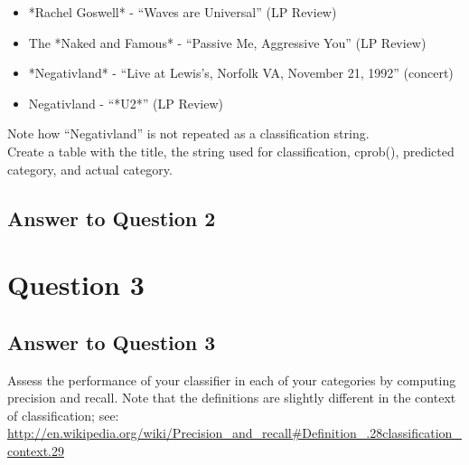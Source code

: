 \documentclass{article}
\begin{document}
\begin{itemize}
\item *Rachel Goswell* - ``Waves are Universal'' (LP Review)
\item The *Naked and Famous* - ``Passive Me, Aggressive You'' (LP Review)
\item *Negativland* - ``Live at Lewis's, Norfolk VA, November 21, 1992'' (concert)
\item Negativland - ``*U2*'' (LP Review)
\end{itemize}

Note how 	``Negativland'' is not repeated as a classification string. \\

Create a table with the title, the string used for classification, cprob(), predicted category, and actual category.

\subsection*{Answer to Question 2}



\newpage
\section*{Question 3}

\subsection*{Answer to Question 3}

Assess the performance of your classifier in each of your categories by computing precision and recall. Note that the definitions are slightly different in the context of classification; see: \url{http://en.wikipedia.org/wiki/Precision_and_recall#Definition_.28classification_context.29}
\end{document}
